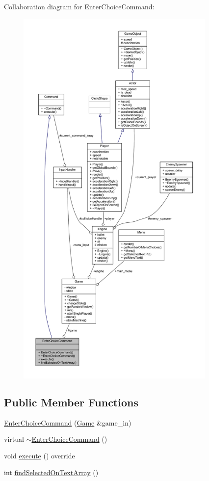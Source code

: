 Collaboration diagram for Enter\+Choice\+Command\+:
\nopagebreak
\begin{figure}[H]
\begin{center}
\leavevmode
\includegraphics[height=550pt]{class_enter_choice_command__coll__graph}
\end{center}
\end{figure}
\subsection*{Public Member Functions}
\begin{DoxyCompactItemize}
\item 
\hyperlink{class_enter_choice_command_ab28cfc3f238985775ec33ebb33c355a6}{Enter\+Choice\+Command} (\hyperlink{class_game}{Game} \&game\+\_\+in)
\item 
virtual \hyperlink{class_enter_choice_command_aa7a330dcd6ffcf6f806c26b577bba21c}{$\sim$\+Enter\+Choice\+Command} ()
\item 
void \hyperlink{class_enter_choice_command_a684f65bfc296353ecefc6edc1c678c70}{execute} () override
\item 
int \hyperlink{class_enter_choice_command_a09b35eafcb1ba6d9e6fb93425702e6c4}{find\+Selected\+On\+Text\+Array} ()
\end{DoxyCompactItemize}
